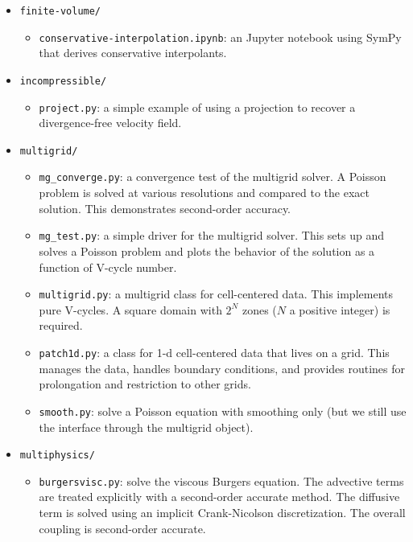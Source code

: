 \begin{itemize}
\item {\tt finite-volume/}

  \begin{itemize}
  \item {\tt conservative-interpolation.ipynb}: an {\sf Jupyter} notebook
    using {\sf SymPy} that derives conservative interpolants.
  \end{itemize}

\item {\tt incompressible/}

  \begin{itemize}
  \item {\tt project.py}: a simple example of using a projection 
    to recover a divergence-free velocity field.
  \end{itemize}

\item {\tt multigrid/}

  \begin{itemize}
  \item {\tt mg\_converge.py}: a convergence test of the multigrid
    solver.  A Poisson problem is solved at various resolutions and
    compared to the exact solution.  This demonstrates second-order
    accuracy.

  \item {\tt mg\_test.py}: a simple driver for the multigrid solver.
    This sets up and solves a Poisson problem and plots the behavior 
    of the solution as a function of V-cycle number.

  \item{\tt multigrid.py}: a multigrid class for cell-centered data.
    This implements pure V-cycles.  A square domain with $2^N$ zones
    ($N$ a positive integer) is required.

  \item {\tt patch1d.py}: a class for 1-d cell-centered data that
    lives on a grid.  This manages the data, handles boundary
    conditions, and provides routines for prolongation and restriction
    to other grids.

  \item {\tt smooth.py}: solve a Poisson equation with smoothing
    only (but we still use the interface through the multigrid object).

  \end{itemize}

\item {\tt multiphysics/}

  \begin{itemize}
  \item {\tt burgersvisc.py}: solve the viscous Burgers equation.
     The advective terms are treated explicitly with a second-order
     accurate method.  The diffusive term is solved using an 
     implicit Crank-Nicolson discretization.  The overall coupling
     is second-order accurate.


\end{itemize}
\end{itemize}
